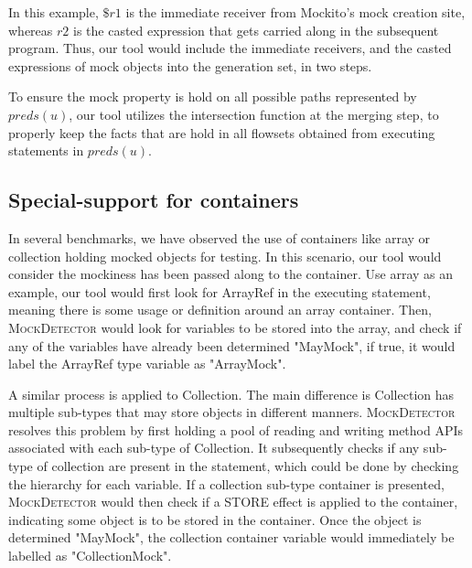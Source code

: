 In this example, $\$r1$ is the immediate receiver from Mockito's mock creation site, whereas $r2$ is the casted expression that gets carried along in the subsequent program. Thus, our tool would include the immediate receivers, and the casted expressions of mock objects into the generation set, in two steps. 

To ensure the mock property is hold on all possible paths represented by $preds(u)$, our tool utilizes the intersection function at the merging step, to properly keep the facts that are hold in all flowsets obtained from executing statements in $preds(u)$.

\subsection{Special-support for containers}
\label{subsec:container}

In several benchmarks, we have observed the use of containers like array or collection holding mocked objects for testing. In this scenario, our tool would consider the mockiness has been passed along to the container. Use array as an example, our tool would first look for ArrayRef in the executing statement, meaning there is some usage or definition around an array container. Then, \textsc{MockDetector} would look for variables to be stored into the array, and check if any of the variables have already been determined "MayMock", if true, it would label the ArrayRef type variable as "ArrayMock".

A similar process is applied to Collection. The main difference is Collection has multiple sub-types that may store objects in different manners. \textsc{MockDetector} resolves this problem by first holding a pool of reading and writing method APIs associated with each sub-type of Collection. It subsequently checks if any sub-type of collection are present in the statement, which could be done by checking the hierarchy for each variable. If a collection sub-type container is presented, \textsc{MockDetector} would then check if a STORE effect is applied to the container, indicating some object is to be stored in the container. Once the object is determined "MayMock", the collection container variable would immediately be labelled as "CollectionMock".
